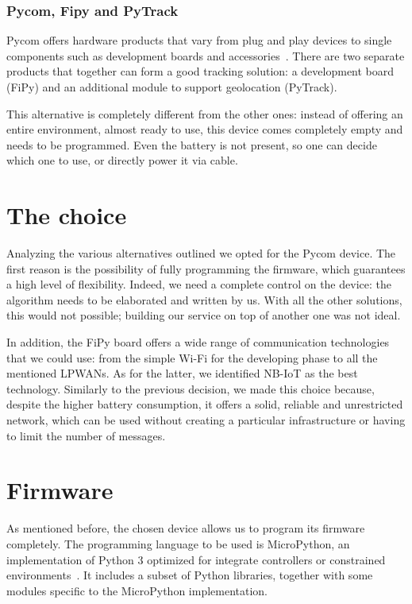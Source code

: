 \subsubsection{Pycom, Fipy and PyTrack}
Pycom offers hardware products that vary from plug and play devices to single components such as development boards and accessories~\cite{pycom}. There are two separate products that together can form a good tracking solution: a development board (FiPy) and an additional module to support geolocation (PyTrack).

This alternative is completely different from the other ones: instead of offering an entire environment, almost ready to use, this device comes completely empty and needs to be programmed. Even the battery is not present, so one can decide which one to use, or directly power it via cable. 

\section{The choice}
\label{sec:track_choice}

Analyzing the various alternatives outlined we opted for the Pycom device. The first reason is the possibility of fully programming the firmware, which guarantees a high level of flexibility. Indeed, we need a complete control on the device: the algorithm needs to be elaborated and written by us. With all the other solutions, this would not possible; building our service on top of another one was not ideal.

In addition, the FiPy board offers a wide range of communication technologies that we could use: from the simple Wi-Fi for the developing phase to all the mentioned LPWANs. As for the latter, we identified NB-IoT as the best technology. Similarly to the previous decision, we made this choice because, despite the higher battery consumption, it offers a solid, reliable and unrestricted network, which can be used without creating a particular infrastructure or having to limit the number of messages.

\section{Firmware}
\label{sec:track_firmware}
As mentioned before, the chosen device allows us to program its firmware completely. The programming language to be used is MicroPython, an implementation of Python 3 optimized for integrate controllers or constrained environments~\cite{micropy}. It includes a subset of Python libraries, together with some modules specific to the MicroPython implementation.

